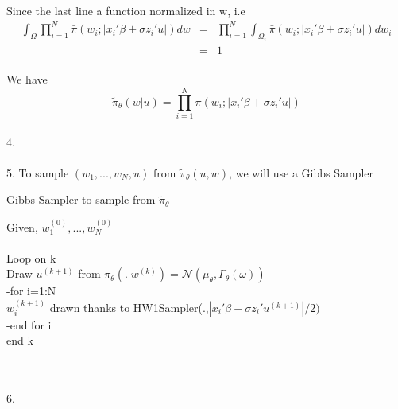 Since the last line a function normalized in w, i.e
\begin{eqnarray*}
	\int_{\Omega}\prod_{i=1}^{N}\bar{\pi}(w_i ;|x_i'\beta + \sigma z_i' u|)dw &=& \prod_{i=1}^{N} \int_{\Omega_i}\bar{\pi}(w_i ;|x_i'\beta + \sigma z_i' u|)dw_i\\
	&=& 1
\end{eqnarray*}~\\    	
We have 
$$\boxed{\tilde{\pi}_{\theta}(w | u)= \prod_{i=1}^{N}\bar{\pi}(w_i ;|x_i'\beta + \sigma z_i' u|)}$$
~\\
4.~\\
~\\
5. To sample $(w_{1},...,w_{N},u)$ from $\tilde{\pi}_{\theta}(u,w)$, we will use a Gibbs Sampler 	

\begin{algorithm}
	\caption{Gibbs Sampler to sample from $\tilde{\pi}_{\theta}$}\label{RS}
	Given, $w_{1}^{(0)}, ..., w_{N}^{(0)}$~\\
	~\\
	Loop on k~\\
	Draw $u^{(k+1)}$ from $\pi_{\theta}(. | w^{(k)}) = \mathcal{N}(\mu_{\theta},\Gamma_{\theta}(\omega))$~\\
	-for i=1:N~\\
	$w_{i}^{(k+1)}$ drawn thanks to HW1Sampler(.,$|x_i'\beta + \sigma z_i' u^{(k+1)}|/2)$\\
	-end for i~\\
	end k
\end{algorithm}~\\
~\\
6.~\\
~\\	

	
	
